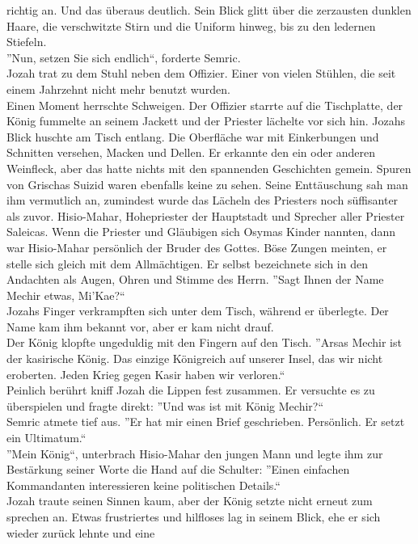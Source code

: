 richtig an. Und das überaus deutlich. Sein Blick glitt über die zerzausten dunklen Haare, die 
verschwitzte Stirn und die Uniform hinweg, bis zu den ledernen Stiefeln. \\
''Nun, setzen Sie sich endlich``, forderte Semric.\\
Jozah trat zu dem Stuhl neben dem Offizier. Einer von vielen Stühlen, die seit einem Jahrzehnt 
nicht mehr benutzt wurden.\\
Einen Moment herrschte Schweigen. Der Offizier starrte auf die Tischplatte, der König fummelte an 
seinem Jackett und der Priester lächelte vor sich hin. Jozahs Blick huschte am Tisch entlang. Die 
Oberfläche war mit Einkerbungen und Schnitten versehen, Macken und Dellen. Er erkannte den ein oder 
anderen Weinfleck, aber das hatte nichts mit den spannenden Geschichten gemein. Spuren von Grischas 
Suizid waren ebenfalls keine zu sehen. Seine Enttäuschung sah man ihm vermutlich an, zumindest 
wurde das Lächeln des Priesters noch süffisanter als zuvor. Hisio-Mahar, Hohepriester der 
Hauptstadt und Sprecher aller Priester Saleicas. Wenn die Priester und Gläubigen sich Osymas Kinder 
nannten, dann war Hisio-Mahar persönlich der Bruder des Gottes. Böse Zungen meinten, er stelle sich 
gleich mit dem Allmächtigen. Er selbst bezeichnete sich in den Andachten als Augen, Ohren und Stimme 
des Herrn. ''Sagt Ihnen der Name Mechir etwas, Mi'Kae?``\\
Jozahs Finger verkrampften sich unter dem Tisch, während er überlegte. Der Name kam ihm bekannt 
vor, aber er kam nicht drauf.\\
Der König klopfte ungeduldig mit den Fingern auf den Tisch. ''Arsas Mechir ist der kasirische 
König. Das einzige Königreich auf unserer Insel, das wir nicht eroberten. Jeden Krieg gegen 
Kasir haben wir verloren.``\\
Peinlich berührt kniff Jozah die Lippen fest zusammen. Er versuchte es zu überspielen und fragte 
direkt: ''Und was ist mit König Mechir?``\\
Semric atmete tief aus. ''Er hat mir einen Brief geschrieben. Persönlich. Er setzt ein 
Ultimatum.``\\
''Mein König``, unterbrach Hisio-Mahar den jungen Mann und legte ihm zur Bestärkung seiner Worte 
die Hand auf die Schulter: ''Einen einfachen Kommandanten interessieren keine politischen 
Details.``\\
Jozah traute seinen Sinnen kaum, aber der König setzte nicht erneut zum sprechen an. Etwas 
frustriertes und hilfloses lag in seinem Blick, ehe er sich wieder zurück lehnte und eine 
